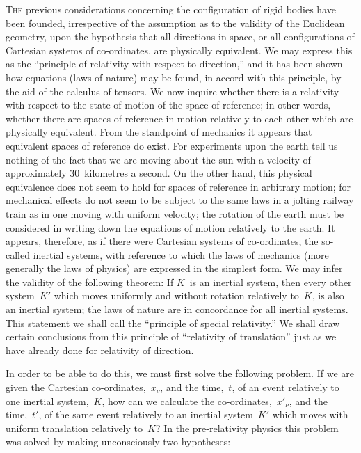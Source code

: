 \documentclass[12pt]{book}[2005/09/16]
\newcommand{\First}[1]{\textsc{\large #1}}
\newcommand{\PageSep}[1]{\ignorespaces}
\begin{document}
\First{The} previous considerations concerning the configuration
of rigid bodies have been founded, irrespective
of the assumption as to the validity of the Euclidean
geometry, upon the hypothesis that all directions in space,
or all configurations of Cartesian systems of co-ordinates,
are physically equivalent. We may express this as the
%
``principle of relativity with respect to direction,'' and it
has been shown how equations (laws of nature) may be
found, in accord with this principle, by the aid of the
calculus of tensors. We now inquire whether there is a
relativity with respect to the state of motion of the space
of reference; in other words, whether there are spaces of
reference in motion relatively to each other which are
physically equivalent. From the standpoint of mechanics
it appears that equivalent spaces of reference do exist.
%
For experiments upon the earth tell us nothing of the
fact that we are moving about the sun with a velocity of
approximately $30$~kilometres a second. On the other
hand, this physical equivalence does not seem to hold for
spaces of reference in arbitrary motion; for mechanical
effects do not seem to be subject to the same laws in a
jolting railway train as in one moving with uniform
\PageSep{27}
velocity; the rotation of the earth must be considered in
writing down the equations of motion relatively to the
earth. It appears, therefore, as if there were Cartesian
systems of co-ordinates, the so-called inertial systems, with
reference to which the laws of mechanics (more generally
the laws of physics) are expressed in the simplest form.
We may infer the validity of the following theorem: If
$K$~is an inertial system, then every other system~$K'$ which
moves uniformly and without rotation relatively to~$K$, is
also an inertial system; the laws of nature are in concordance
for all inertial systems. This statement we shall
call the ``principle of special relativity.'' We shall draw
certain conclusions from this principle of ``relativity of
translation'' just as we have already done for relativity of
direction.

In order to be able to do this, we must first solve the
following problem. If we are given the Cartesian co-ordinates,~$x_{\nu}$,
and the time,~$t$, of an event relatively to one
inertial system,~$K$, how can we calculate the co-ordinates,~${x'}_{\nu}$,
and the time,~$t'$, of the same event relatively to an
inertial system~$K'$ which moves with uniform translation
relatively to~$K$? In the pre-relativity physics
%
this problem was solved by making unconsciously two
hypotheses:---
\end{document}
